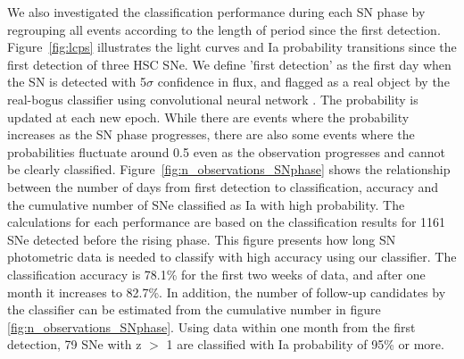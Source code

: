 \documentclass[proof]{pasj01}
\begin{document}
We also investigated the classification performance during each SN phase by regrouping all events according to the length of period since the first detection.
Figure\ \ref{fig:lcps} illustrates the light curves and Ia probability transitions since the first detection of three HSC SNe.
We define 'first detection' as the first day when the SN is detected with 5$\sigma$ confidence in flux, and flagged as a real object by the real-bogus classifier using convolutional neural network \citep{yasuda19a}.
The probability is updated at each new epoch.
While there are events where the probability increases as the SN phase progresses, there are also some events where the probabilities fluctuate around 0.5 even as the observation progresses and cannot be clearly classified.
Figure\ \ref{fig:n_observations_SNphase} shows the relationship between the number of days from first detection to classification, accuracy and the cumulative number of SNe classified as Ia with high probability.
The calculations for each performance are based on the classification results for 1161 SNe detected before the rising phase.
This figure presents how long SN photometric data is needed to classify with high accuracy using our classifier.
The classification accuracy is 78.1\% for the first two weeks of data, and after one month it increases to 82.7\%.
In addition, the number of follow-up candidates by the classifier can be estimated from the cumulative number in figure \ref{fig:n_observations_SNphase}.
Using data within one month from the first detection, 79 SNe with z $>$ 1 are classified with Ia probability of 95\% or more.
\end{document}
